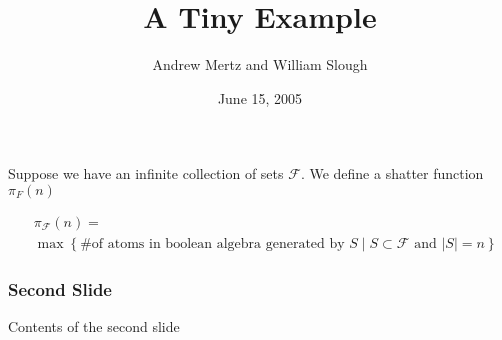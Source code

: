 \documentclass{beamer}
\title{A Tiny Example}
\author{Andrew Mertz and William Slough}
\date{June 15, 2005}
\newcommand{\F}{\mathcal F}
\newcommand{\curly}[1]{\left\{ #1 \right\}}
\begin{document}
\maketitle

\begin{frame}
	Suppose we have an infinite collection of sets $\F$. We define a shatter function $\pi_F(n)$

	\begin{align*}
		&\pi_\F(n) = \\
		&\max \curly{ \text {\# of atoms in boolean algebra generated by $S$} \mid S \subset \F \text{ and } |S| = n}
	\end{align*}
\end{frame}

\begin{frame}
	\frametitle{Second Slide}
	Contents of the second slide
\end{frame}
\end{document}
